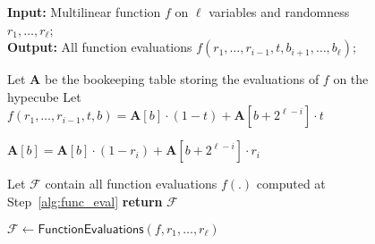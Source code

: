 \begin{figure}
\begin{algorithm}[H]
		\caption{$\mathcal{F}\leftarrow \textsf{FunctionEvaluations}(f,r_1,\ldots,r_\ell)$}\label{alg:evaluate}
		 \textbf{Input:} Multilinear function $f$ on $\ell$ variables and randomness $r_1,\ldots,r_\ell$;  \\
    \textbf{Output:} All function evaluations $f(r_1,\ldots, r_{i-1}, t, b_{i+1},\ldots, b_{\ell})$; 
   
		\begin{algorithmic}[1]
		 
\State \label{bookkeeping_step}Let $\textbf{A}$ be the bookeeping table storing the evaluations of $f$ on the hypecube
				  \label{step:consider_b}
					 \State \label{alg:func_eval} Let $f(r_1,\ldots, r_{i-1}, t, b) = \textbf{A}[b]\cdot (1-t)+\textbf{A}[b+2^{\ell-i}]\cdot t$
					\EndFor
					
					
					
					\State\label{alg::dynamic::update} $\textbf{A}[b]=\textbf{A}[b]\cdot(1-r_i)+\textbf{A}[b+2^{\ell-i}]\cdot r_i$
				\EndFor
								
		
		\EndFor	
		\State Let $\mathcal{F}$ contain all function evaluations $f(.)$ computed at Step~\ref{alg:func_eval}
		\State \textbf{return} $\mathcal{F}$
		\end{algorithmic}
	\end{algorithm}
	
\end{figure}

